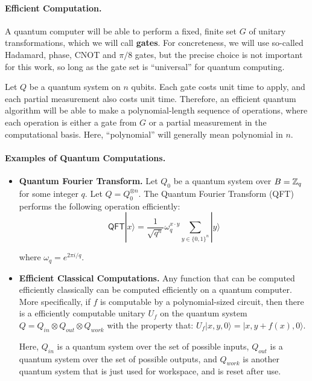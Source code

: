 \paragraph{Efficient Computation.} A quantum computer will be able to perform a fixed, finite set $G$ of unitary transformations, which we will call {\bf gates}.  For concreteness, we will use so-called Hadamard, phase, CNOT and $\pi/8$ gates, but the precise choice is not important for this work, so long as the gate set is ``universal'' for quantum computing.

Let $Q$ be a quantum system on $n$ qubits.  Each gate costs unit time to apply, and each partial measurement also costs unit time.  Therefore, an efficient quantum algorithm will be able to make a polynomial-length sequence of operations, where each operation is either a gate from $G$ or a partial measurement in the computational basis.  Here, ``polynomial'' will generally mean polynomial in $n$.
\paragraph{Examples of Quantum Computations.}
\begin{itemize}\setlength\itemsep{-0em}
	\item {\bf Quantum Fourier Transform.} Let $Q_0$ be a quantum system over $B=\mathbb{Z}_q$ for some integer $q$.  Let $Q=Q_0^{\otimes n}$.  The Quantum Fourier Transform (QFT) performs the following operation efficiently: 
	\[\mathsf{QFT}|x\rangle = \frac{1}{\sqrt{q^n}}\omega_q^{x\cdot y}\sum_{y\in\{0,1\}^n}|y\rangle\]

	where $\omega_q=e^{2\pi i/q}$.
	
	\item {\bf Efficient Classical Computations.} Any function that can be computed efficiently classically can be computed efficiently on a quantum computer.  More specifically, if $f$ is computable by a polynomial-sized circuit, then there is a efficiently computable unitary $U_f$ on the quantum system $Q=Q_{in}\otimes Q_{out}\otimes Q_{work}$ with the property that: $U_f |x,y,0\rangle = |x,y+f(x),0\rangle$.
	
	Here, $Q_{in}$ is a quantum system over the set of possible inputs, $Q_{out}$ is a quantum system over the set of possible outputs, and $Q_{work}$ is another quantum system that is just used for workspace, and is reset after use.

\end{itemize}
\vspace{-1.6\topsep}

